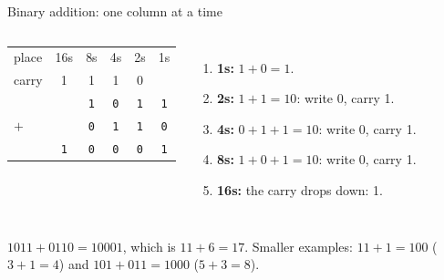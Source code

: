 \documentclass[aspectratio=169,10pt]{beamer}
\newcommand{\gc}[1]{\textcolor{black!60}{\footnotesize #1}}
\begin{document}
\begin{frame}{Binary addition: one column at a time}
\begin{columns}[c]
\begin{center}{\LARGE
\begin{tabular}{@{}l@{\ \ }c@{\ \ }c@{\ \ }c@{\ \ }c@{\ \ }c@{}}
\gc{place} & \gc{16s} & \gc{8s} & \gc{4s} & \gc{2s} & \gc{1s}\\
\gc{carry} & \gc{1} & \gc{1} & \gc{1} & \gc{0} & \\
 & & \texttt{1} & \texttt{0} & \texttt{1} & \texttt{1}\\
$+$ & & \texttt{0} & \texttt{1} & \texttt{1} & \texttt{0}\\\hline
 & \texttt{1} & \texttt{0} & \texttt{0} & \texttt{0} & \texttt{1}
\end{tabular}}\end{center}
\small
\begin{enumerate}
\item \textbf{1s:} $1+0=1$.
\item \textbf{2s:} $1+1=10$: write 0, carry 1.
\item \textbf{4s:} $0+1+1=10$: write 0, carry 1.
\item \textbf{8s:} $1+0+1=10$: write 0, carry 1.
\item \textbf{16s:} the carry drops down: 1.
\end{enumerate}
\end{columns}
\vspace{4pt}
$1011+0110=10001$, which is $11+6=17$. Smaller examples: $11+1=100$ ($3+1=4$) and $101+011=1000$ ($5+3=8$).
\end{frame}
\end{document}
